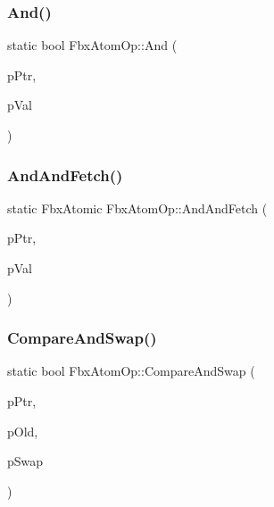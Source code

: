 \subsubsection{\texorpdfstring{And()}{And()}}
{\footnotesize\ttfamily static bool Fbx\+Atom\+Op\+::\+And (\begin{DoxyParamCaption}\item[{volatile Fbx\+Atomic $\ast$}]{p\+Ptr,  }\item[{Fbx\+Atomic}]{p\+Val }\end{DoxyParamCaption})\hspace{0.3cm}{\ttfamily [static]}}

\mbox{\label{class_fbx_atom_op_a9306c3602d296c4dbcd9bda4c3dd22cb}} 
\subsubsection{\texorpdfstring{And\+And\+Fetch()}{AndAndFetch()}}
{\footnotesize\ttfamily static Fbx\+Atomic Fbx\+Atom\+Op\+::\+And\+And\+Fetch (\begin{DoxyParamCaption}\item[{volatile Fbx\+Atomic $\ast$}]{p\+Ptr,  }\item[{Fbx\+Atomic}]{p\+Val }\end{DoxyParamCaption})\hspace{0.3cm}{\ttfamily [static]}}

\mbox{\label{class_fbx_atom_op_a2f91e98684ce91ba6ef1764ba7b02146}} 
\subsubsection{\texorpdfstring{Compare\+And\+Swap()}{CompareAndSwap()}}
{\footnotesize\ttfamily static bool Fbx\+Atom\+Op\+::\+Compare\+And\+Swap (\begin{DoxyParamCaption}\item[{volatile Fbx\+Atomic $\ast$}]{p\+Ptr,  }\item[{Fbx\+Atomic}]{p\+Old,  }\item[{Fbx\+Atomic}]{p\+Swap }\end{DoxyParamCaption})\hspace{0.3cm}{\ttfamily [static]}}

